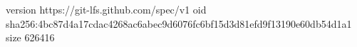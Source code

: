 version https://git-lfs.github.com/spec/v1
oid sha256:4bc87d4a17cdac4268ac6abec9d6076fc6bf15d3d81efd9f13190e60db54d1a1
size 626416
